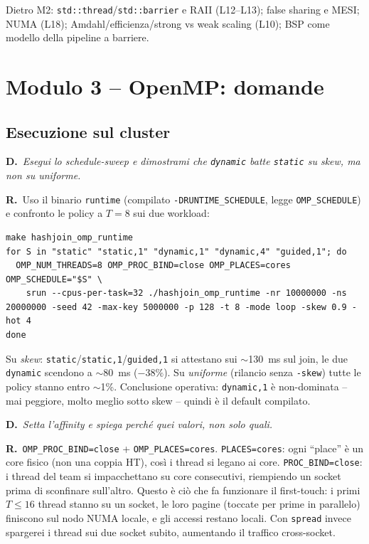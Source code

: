 \documentclass[11pt,a4paper]{article}
\newcommand{\D}[1]{\begin{dom}\small\textbf{D.}\ \itshape #1\end{dom}}
\newcommand{\R}{\noindent\textbf{R.}\ }
\begin{document}
\begin{theorybox}
Dietro M2: \texttt{std::thread}/\texttt{std::barrier} e RAII (L12--L13); false sharing e MESI; NUMA (L18); Amdahl/efficienza/strong vs weak scaling (L10); BSP come modello della pipeline a barriere.
\end{theorybox}
\section{Modulo 3 -- OpenMP: domande}

\subsection{Esecuzione sul cluster}

\D{Esegui lo schedule-sweep e dimostrami che \texttt{dynamic} batte \texttt{static} su skew, ma non su uniforme.}
\R Uso il binario \texttt{runtime} (compilato \texttt{-DRUNTIME\_SCHEDULE}, legge \texttt{OMP\_SCHEDULE}) e confronto le policy a $T=8$ sui due workload:
\begin{lstlisting}[style=bash]
make hashjoin_omp_runtime
for S in "static" "static,1" "dynamic,1" "dynamic,4" "guided,1"; do
  OMP_NUM_THREADS=8 OMP_PROC_BIND=close OMP_PLACES=cores OMP_SCHEDULE="$S" \
    srun --cpus-per-task=32 ./hashjoin_omp_runtime -nr 10000000 -ns 20000000 -seed 42 -max-key 5000000 -p 128 -t 8 -mode loop -skew 0.9 -hot 4
done
\end{lstlisting}
Su \emph{skew}: \texttt{static}/\texttt{static,1}/\texttt{guided,1} si attestano sui $\sim$130~ms sul join, le due \texttt{dynamic} scendono a $\sim$80~ms ($-38\%$). Su \emph{uniforme} (rilancio senza \texttt{-skew}) tutte le policy stanno entro $\sim$1\%. Conclusione operativa: \texttt{dynamic,1} è non-dominata -- mai peggiore, molto meglio sotto skew -- quindi è il default compilato.

\D{Setta l'affinity e spiega \emph{perché} quei valori, non solo quali.}
\R \texttt{OMP\_PROC\_BIND=close} + \texttt{OMP\_PLACES=cores}. \texttt{PLACES=cores}: ogni ``place'' è un core fisico (non una coppia HT), così i thread si legano ai core. \texttt{PROC\_BIND=close}: i thread del team si impacchettano su core consecutivi, riempiendo un socket prima di sconfinare sull'altro. Questo è ciò che fa funzionare il first-touch: i primi $T\le16$ thread stanno su un socket, le loro pagine (toccate per prime in parallelo) finiscono sul nodo NUMA locale, e gli accessi restano locali. Con \texttt{spread} invece spargerei i thread sui due socket subito, aumentando il traffico cross-socket.
\end{document}
